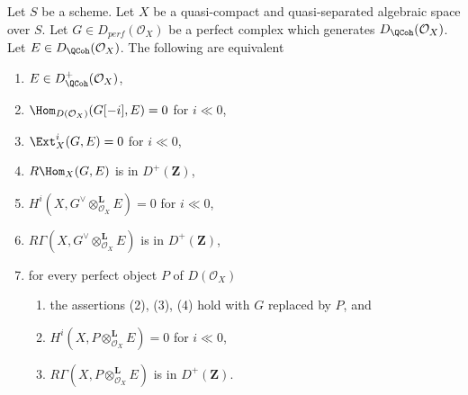\begin{proposition}
\label{proposition-detecting-bounded-below}
Let $S$ be a scheme.
Let $X$ be a quasi-compact and quasi-separated algebraic space over $S$.
Let $G \in D_{perf}(\mathcal{O}_X)$ be a perfect complex which generates
$D_\QCoh (\mathcal{O}_X)$. Let $E \in D_\QCoh (\mathcal{O}_X)$.
The following are equivalent
\begin{enumerate}
\item $E \in D^+_\QCoh (\mathcal{O}_X)$,
\item $\Hom_{D(\mathcal{O}_X)}(G[-i], E) = 0$ for $i \ll 0$,
\item $\Ext^i_X(G, E) = 0$ for $i \ll 0$,
\item $R\Hom_X(G, E)$ is in $D^+(\mathbf{Z})$,
\item $H^i(X, G^\vee \otimes_{\mathcal{O}_X}^\mathbf{L} E) = 0$
for $i \ll 0$,
\item $R\Gamma(X, G^\vee \otimes_{\mathcal{O}_X}^\mathbf{L} E)$
is in $D^+(\mathbf{Z})$,
\item for every perfect object $P$ of $D(\mathcal{O}_X)$
\begin{enumerate}
\item the assertions (2), (3), (4) hold with $G$ replaced by $P$, and
\item $H^i(X, P \otimes_{\mathcal{O}_X}^\mathbf{L} E) = 0$ for $i \ll 0$,
\item $R\Gamma(X, P \otimes_{\mathcal{O}_X}^\mathbf{L} E)$
is in $D^+(\mathbf{Z})$.
\end{enumerate}
\end{enumerate}
\end{proposition}

